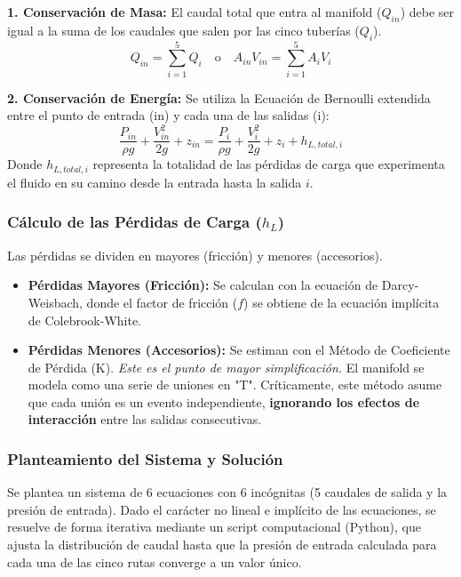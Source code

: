 \documentclass[11pt, a4paper,oneside]{article}
\begin{document}
\textbf{1. Conservación de Masa:} El caudal total que entra al manifold ($Q_{in}$) debe ser igual a la suma de los caudales que salen por las cinco tuberías ($Q_i$).
\begin{equation}
    Q_{in} = \sum_{i=1}^{5} Q_{i} \quad \text{o} \quad A_{in}V_{in} = \sum_{i=1}^{5} A_{i}V_{i}
\end{equation}

\textbf{2. Conservación de Energía:} Se utiliza la Ecuación de Bernoulli extendida entre el punto de entrada (in) y cada una de las salidas (i):
\begin{equation}
    \frac{P_{in}}{\rho g} + \frac{V_{in}^2}{2g} + z_{in} = \frac{P_{i}}{\rho g} + \frac{V_{i}^2}{2g} + z_{i} + h_{L,total,i}
\end{equation}
Donde $h_{L,total,i}$ representa la totalidad de las pérdidas de carga que experimenta el fluido en su camino desde la entrada hasta la salida $i$.

\subsubsection{Cálculo de las Pérdidas de Carga ($h_{L}$)}
Las pérdidas se dividen en mayores (fricción) y menores (accesorios).
\begin{itemize}
    \item \textbf{Pérdidas Mayores (Fricción):} Se calculan con la ecuación de Darcy-Weisbach, donde el factor de fricción ($f$) se obtiene de la ecuación implícita de Colebrook-White.
    \item \textbf{Pérdidas Menores (Accesorios):} Se estiman con el Método de Coeficiente de Pérdida (K). \textit{Este es el punto de mayor simplificación.} El manifold se modela como una serie de uniones en "T". Críticamente, este método asume que cada unión es un evento independiente, \textbf{ignorando los efectos de interacción} entre las salidas consecutivas.
\end{itemize}

\subsubsection{Planteamiento del Sistema y Solución}
Se plantea un sistema de 6 ecuaciones con 6 incógnitas (5 caudales de salida y la presión de entrada). Dado el carácter no lineal e implícito de las ecuaciones, se resuelve de forma iterativa mediante un script computacional (Python), que ajusta la distribución de caudal hasta que la presión de entrada calculada para cada una de las cinco rutas converge a un valor único.
\end{document}
